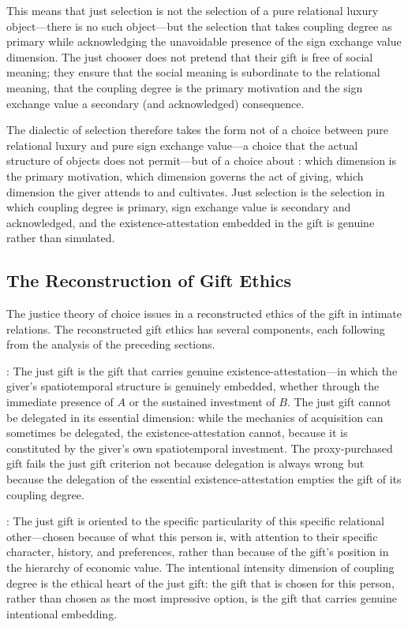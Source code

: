 This means that just selection is not the selection of a pure relational luxury object---there is no such object---but the selection that takes coupling degree as primary while acknowledging the unavoidable presence of the sign exchange value dimension. The just chooser does not pretend that their gift is free of social meaning; they ensure that the social meaning is subordinate to the relational meaning, that the coupling degree is the primary motivation and the sign exchange value a secondary (and acknowledged) consequence.

The dialectic of selection therefore takes the form not of a choice between pure relational luxury and pure sign exchange value---a choice that the actual structure of objects does not permit---but of a choice about : which dimension is the primary motivation, which dimension governs the act of giving, which dimension the giver attends to and cultivates. Just selection is the selection in which coupling degree is primary, sign exchange value is secondary and acknowledged, and the existence-attestation embedded in the gift is genuine rather than simulated.

\subsection{The Reconstruction of Gift Ethics}
\label{p16:subsec:gift_ethics}

\noindent
The justice theory of choice issues in a reconstructed ethics of the gift in intimate relations. The reconstructed gift ethics has several components, each following from the analysis of the preceding sections.

: The just gift is the gift that carries genuine existence-attestation---in which the giver's spatiotemporal structure is genuinely embedded, whether through the immediate presence of $A$ or the sustained investment of $B$. The just gift cannot be delegated in its essential dimension: while the mechanics of acquisition can sometimes be delegated, the existence-attestation cannot, because it is constituted by the giver's own spatiotemporal investment. The proxy-purchased gift fails the just gift criterion not because delegation is always wrong but because the delegation of the essential existence-attestation empties the gift of its coupling degree.

: The just gift is oriented to the specific particularity of this specific relational other---chosen because of what this person is, with attention to their specific character, history, and preferences, rather than because of the gift's position in the hierarchy of economic value. The intentional intensity dimension of coupling degree is the ethical heart of the just gift: the gift that is chosen for this person, rather than chosen as the most impressive option, is the gift that carries genuine intentional embedding.

